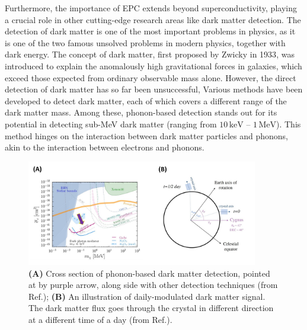 \documentclass[11pt]{article}
\begin{document}
Furthermore, the importance of EPC extends beyond superconductivity, playing a crucial role in other cutting-edge research areas like dark matter detection. The detection of dark matter is one of the most important problems in physics, as it is one of the two famous unsolved problems in modern physics, together with dark energy.
The concept of dark matter, first proposed by Zwicky in 1933\cite{andernach_english_2017}, was introduced to explain the anomalously high gravitational forces in galaxies, which exceed those expected from ordinary observable mass alone. However, the direct detection of dark matter has so far been unsuccessful,
Various methods have been developed to detect dark matter\cite{bergstrom_non-baryonic_2000}, each of which covers a different range of the dark matter mass\cite{vogel_dark_2014,essig_first_2012,davidson_updated_2000}. Among these, phonon-based detection stands out for its potential in detecting sub-MeV dark matter (ranging from $ 10\,\mathrm{keV}$ -- $1\,\mathrm{MeV}$). This method hinges on the interaction between dark matter particles and phonons, akin to the interaction between electrons and phonons\cite{griffin_directional_2018}. 

\begin{figure}
    \centering
    \includegraphics[width=0.9\textwidth]{figures/third_figure.jpg}
    \caption{\textbf{(A)} Cross section of phonon-based dark matter detection, pointed at by purple arrow, along side with other detection techniques (from Ref.\cite{griffin_directional_2018}); \textbf{(B)} An illustration of daily-modulated dark matter signal. The dark matter flux goes through the crystal in different direction at a different time of a day (from Ref.\cite{griffin_directional_2018}).}
    \label{third_figure}
\end{figure}
\end{document}
